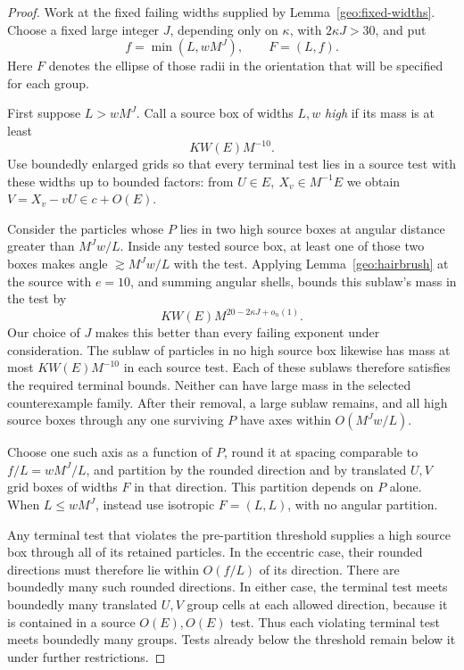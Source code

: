 \begin{proof}
Work at the fixed failing widths supplied by
Lemma~\ref{geo:fixed-widths}.  Choose a fixed large integer \(J\),
depending only on \(\kappa\), with \(2\kappa J>30\), and put
\[
f=\min(L,wM^J),\qquad F=(L,f).
\]
Here \(F\) denotes the ellipse of those radii in the orientation
that will be specified for each group.

First suppose \(L>wM^J\).  Call a source box of widths \(L,w\)
\emph{high} if its mass is at least
\[
KW(E)M^{-10}.
\]
Use boundedly enlarged grids so that every terminal test lies
in a source test with these widths up to bounded factors:
from \(U\in E,\ X_v\in M^{-1}E\) we obtain
\(V=X_v-vU\in c+O(E)\).

Consider the particles whose \(P\) lies in two high source boxes
at angular distance greater than \(M^Jw/L\).  Inside any tested
source box, at least one of those two boxes makes angle
\(\gtrsim M^Jw/L\) with the test.  Applying
Lemma~\ref{geo:hairbrush} at the source with \(e=10\), and
summing angular shells, bounds this sublaw's mass in the test by
\[
KW(E)M^{20-2\kappa J+o_n(1)}.
\]
Our choice of \(J\) makes this better than every failing exponent
under consideration.  The sublaw of particles in no high source
box likewise has mass at most \(KW(E)M^{-10}\) in each source
test.  Each of these sublaws therefore satisfies the required
terminal bounds.  Neither can have large mass in the selected
counterexample family.  After their removal, a large sublaw
remains, and all high source boxes through any one surviving
\(P\) have axes within \(O(M^Jw/L)\).

Choose one such axis as a function of \(P\), round it at spacing
comparable to \(f/L=wM^J/L\), and partition by the rounded
direction and by translated \(U,V\) grid boxes of widths \(F\)
in that direction.  This partition depends on \(P\) alone.
When \(L\le wM^J\), instead use isotropic \(F=(L,L)\), with
no angular partition.

Any terminal test that violates the pre-partition threshold
supplies a high source box through all of its retained
particles.  In the eccentric case, their rounded directions
must therefore lie within \(O(f/L)\) of its direction.  There
are boundedly many such rounded directions.  In either case,
the terminal test meets boundedly many translated \(U,V\)
group cells at each allowed direction, because it is contained
in a source \(O(E),O(E)\) test.  Thus each violating terminal
test meets boundedly many groups.  Tests already below the
threshold remain below it under further restrictions.


\end{proof}
